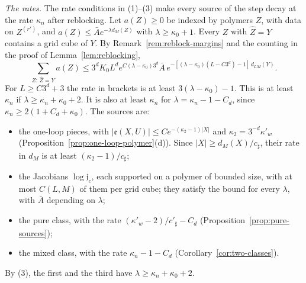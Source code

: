 \begin{remark}[Parameters]
\emph{The rates.} The rate conditions in (1)--(3) make every source of the step decay at the rate $\kappa_n$ after reblocking. Let $a(Z)\ge0$ be indexed by polymers $Z$, with data on $Z^{(r')}$, and $a(Z)\le\bar Ae^{-\lambda d_M(Z)}$ with $\lambda\ge\kappa_0+1$. Every $Z$ with $\hat Z=Y$ contains a grid cube of $Y$. By Remark~\ref{rem:reblock-margins} and the counting in the proof of Lemma~\ref{lem:reblocking},
\[
\sum_{Z:\,\hat Z=Y}a(Z)\le3^dK_0L^de^{C(\lambda-\kappa_0)3^d}\bar A\,e^{-[(\lambda-\kappa_0)(L-C3^d)-1]\,d_{LM}(Y)} .
\]
For $L\ge C3^d+3$ the rate in brackets is at least $3(\lambda-\kappa_0)-1$. This is at least $\kappa_n$ if $\lambda\ge\kappa_n+\kappa_0+2$. It is also at least $\kappa_n$ for $\lambda=\kappa_n-1-C_d$, since $\kappa_n\ge2(1+C_d+\kappa_0)$. The sources are:
\begin{itemize}
\item the one-loop pieces, with $|\mathfrak e(X,U)|\le Ce^{-(\kappa_2-1)|X|}$ and $\kappa_2=3^{-d}\kappa'_w$ (Proposition~\ref{prop:one-loop-polymer}(d)). Since $|X|\ge d_M(X)/c_\sharp$, their rate in $d_M$ is at least $(\kappa_2-1)/c_\sharp$;
\item the Jacobians $\log\mathfrak j_c$, each supported on a polymer of bounded size, with at most $C(L,M)$ of them per grid cube; they satisfy the bound for every $\lambda$, with $\bar A$ depending on $\lambda$;
\item the pure class, with the rate $(\kappa'_w-2)/c'_\sharp-C_d$ (Proposition~\ref{prop:pure-sources});
\item the mixed class, with the rate $\kappa_n-1-C_d$ (Corollary~\ref{cor:two-classes}).
\end{itemize}
By (3), the first and the third have $\lambda\ge\kappa_n+\kappa_0+2$.


\end{remark}
